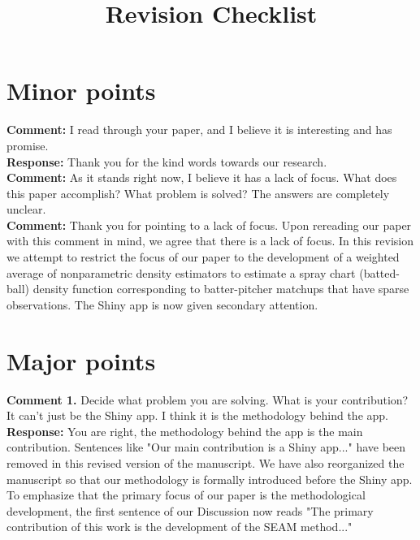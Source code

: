 \documentclass[12pt]{article}
\title{Revision Checklist}
\author{}
\date{}
\begin{document}
\maketitle

\section*{Minor points}

\noindent\textbf{Comment:} I read through your paper, and I believe it is interesting and has promise. \\

\noindent\textbf{Response:} Thank you for the kind words towards our research. \\

\noindent\textbf{Comment:} As it stands right now, I believe it has a lack of focus. What does this paper accomplish? What problem is solved? The answers are completely unclear. \\

\noindent\textbf{Comment:} Thank you for pointing to a lack of focus. Upon rereading our paper with this comment in mind, we agree that there is a lack of focus. In this revision we attempt to restrict the focus of our paper to the development of a weighted average of nonparametric density estimators to estimate a spray chart (batted-ball) density function corresponding to batter-pitcher matchups that have sparse observations. The Shiny app is now given secondary attention.

\section*{Major points}

\noindent\textbf{Comment 1.} Decide what problem you are solving. What is your contribution? It can’t just be the Shiny app. I think it is the methodology behind the app. \\

\noindent\textbf{Response:} You are right, the methodology behind the app is the main contribution. Sentences like "Our main contribution is a Shiny app..." have been removed in this revised version of the manuscript. We have also reorganized the manuscript so that our methodology is formally introduced before the Shiny app. To emphasize that the primary focus of our paper is the methodological development, the first sentence of our Discussion now reads "The primary contribution of this work is the development of the SEAM method..." \\
\end{document}
